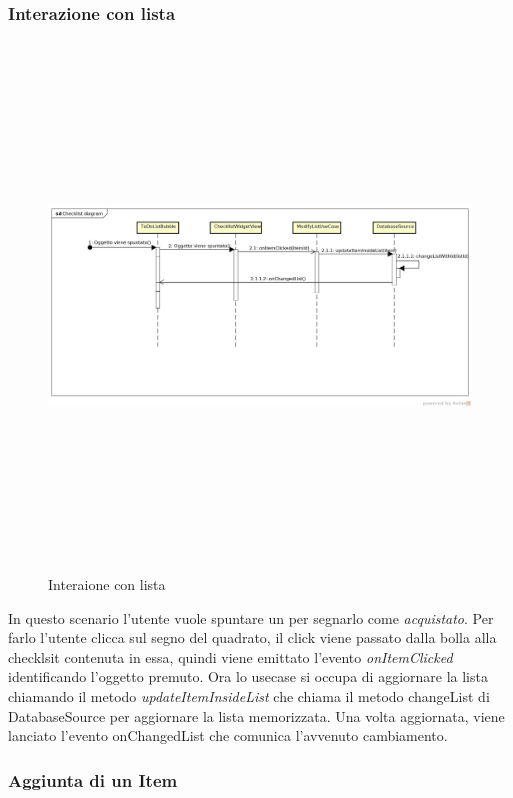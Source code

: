 \subsubsection{Interazione con lista }

\label{Interaione con lista}
\begin{figure}[H]
	\centering
	\includegraphics[width=16cm, height=14cm]{Sezioni/Diagrammi/img_app/Checklist_diagram.jpg}
	\caption{Interaione con lista}
\end{figure}

In questo scenario l'utente vuole spuntare un  per segnarlo come \textit{acquistato}.
Per farlo l'utente clicca sul segno del quadrato, il click viene passato dalla bolla alla checklsit contenuta in essa, quindi viene emittato l'evento \textit{onItemClicked} identificando l'oggetto premuto. Ora lo usecase si occupa di aggiornare la lista chiamando il metodo \textit{updateItemInsideList} che chiama il metodo changeList di DatabaseSource per aggiornare la lista memorizzata. Una volta aggiornata, viene lanciato l'evento onChangedList che comunica l'avvenuto cambiamento.


\subsubsection{Aggiunta di un Item}

